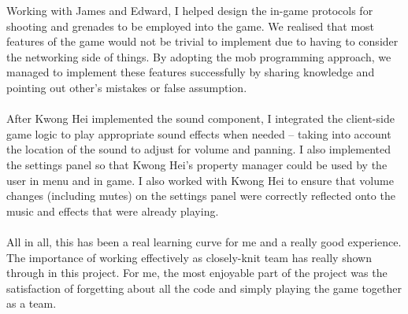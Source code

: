 \documentclass[12pt]{article}
\newcommand{\return}{\\\\\noindent}
\begin{document}
Working with James and Edward, I helped design the in-game protocols for shooting and grenades to be employed into the game. We realised that most features of the game would not be trivial to implement due to having to consider the networking side of things. By adopting the mob programming approach, we managed to implement these features successfully by sharing knowledge and pointing out other's mistakes or false assumption.\return
After Kwong Hei implemented the sound component, I integrated the client-side game logic to play appropriate sound effects when needed -- taking into account the location of the sound to adjust for volume and panning. I also implemented the settings panel so that Kwong Hei's property manager could be used by the user in menu and in game. I also worked with Kwong Hei to ensure that volume changes (including mutes) on the settings panel were correctly reflected onto the music and effects that were already playing.\return
All in all, this has been a real learning curve for me and a really good experience. The importance of working effectively as closely-knit team has really shown through in this project. For me, the most enjoyable part of the project was the satisfaction of forgetting about all the code and simply playing the game together as a team.
\newpage
\end{document}
